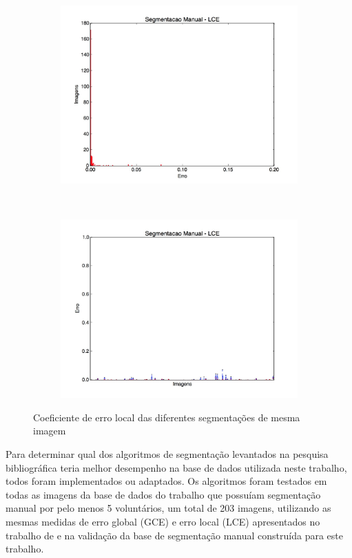\begin{figure}[h]
  \centering
  \begin{subfigure}[b]{0.5\textwidth}
    \includegraphics[width=\textwidth]{imgs/manual_lce}
  \end{subfigure}%
  ~
  \begin{subfigure}[b]{0.5\textwidth}
    \includegraphics[width=\textwidth]{imgs/manual_dist_lce}
  \end{subfigure}%
  \caption{Coeficiente de erro local das diferentes segmentações de mesma imagem}
  \label{fig:manual_lce}
\end{figure}

Para determinar qual dos algoritmos de segmentação levantados na pesquisa bibliográfica teria melhor desempenho na base de dados utilizada neste trabalho, todos foram implementados ou adaptados. Os algoritmos foram testados em todas as imagens da base de dados do trabalho que possuíam segmentação manual por pelo menos 5 voluntários, um total de 203 imagens, utilizando as mesmas medidas de erro global (GCE) e erro local (LCE) apresentados no trabalho de  e na validação da base de segmentação manual construída para este trabalho.

